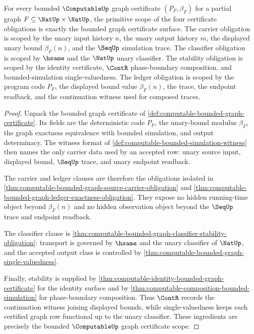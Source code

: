 \begin{theorem}
\label{thm:computable-bounded-graph-certificate-scope}
For every bounded $\ComputableUp$ graph certificate $(P_F,\beta_F)$ for a partial graph $F\subseteq\NatUp\times\NatUp$, the primitive scope of the four certificate obligations is exactly the bounded graph certificate surface. The carrier obligation is scoped by the unary input history $n$, the unary output history $m$, the displayed unary bound $\beta_F(n)$, and the $\SeqUp$ simulation trace. The classifier obligation is scoped by $\hsame$ and the $\NatUp$ unary classifier. The stability obligation is scoped by the identity certificate, $\ContR$ phase-boundary composition, and bounded-simulation single-valuedness. The ledger obligation is scoped by the program code $P_F$, the displayed bound value $\beta_F(n)$, the trace, the endpoint readback, and the continuation witness used for composed traces.
\end{theorem}
\begin{proof}
Unpack the bounded graph certificate of \autoref{def:computable-bounded-graph-certificate}. Its fields are the deterministic code $P_F$, the unary-bound modulus $\beta_F$, the graph exactness equivalence with bounded simulation, and output determinacy. The witness format of \autoref{def:computable-bounded-simulation-witness} then names the only carrier data used by an accepted row: unary source input, displayed bound, $\SeqUp$ trace, and unary endpoint readback.

The carrier and ledger clauses are therefore the obligations isolated in \autoref{thm:computable-bounded-graph-source-carrier-obligation} and \autoref{thm:computable-bounded-graph-ledger-exactness-obligation}. They expose no hidden running-time object beyond $\beta_F(n)$ and no hidden observation object beyond the $\SeqUp$ trace and endpoint readback.

The classifier clause is \autoref{thm:computable-bounded-graph-classifier-stability-obligation}: transport is governed by $\hsame$ and the unary classifier of $\NatUp$, and the accepted output class is controlled by \autoref{thm:computable-bounded-graph-single-valuedness}.

Finally, stability is supplied by \autoref{thm:computable-identity-bounded-graph-certificate} for the identity surface and by \autoref{thm:computable-composition-bounded-simulation} for phase-boundary composition. Thus $\ContR$ records the continuation witness joining displayed bounds, while single-valuedness keeps each certified graph row functional up to the unary classifier. These ingredients are precisely the bounded $\ComputableUp$ graph certificate scope.
\end{proof}

